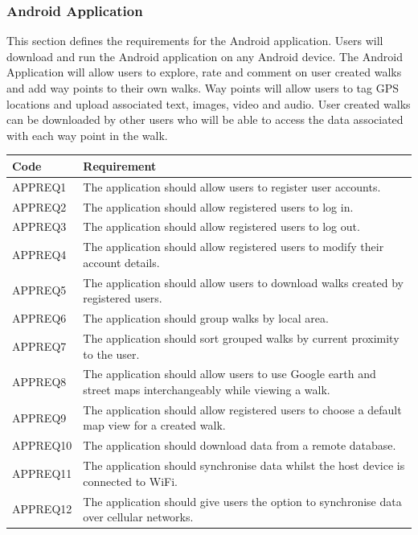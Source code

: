 \documentclass[11pt,a4paper]{article}
\begin{document}
\subsubsection{Android Application}
\label{sec:app-reqs}

This section defines the requirements for the Android application.
Users will download and run the Android application on any Android device.
The Android Application will allow users to explore, rate and comment on user created walks and add way points to their own walks.
Way points will allow users to tag GPS locations and upload associated text, images, video and audio.
User created walks can be downloaded by other users who will be able to access the data associated with each way point in the walk.

\begin{longtable}{|p{2.5cm}p{13cm}|}
\hline
\textbf{Code} & \textbf{Requirement} \\
\hline
APPREQ1 & The application should allow users to register user accounts. \\ \hline
APPREQ2 & The application should allow registered users to log in. \\ \hline
APPREQ3 & The application should allow registered users to log out. \\ \hline
APPREQ4 & The application should allow registered users to modify their account details. \\ \hline
APPREQ5 & The application should allow users to download walks created by registered users. \\ \hline
APPREQ6 & The application should group walks by local area. \\ \hline
APPREQ7 & The application should sort grouped walks by current proximity to the user. \\ \hline
APPREQ8 & The application should allow users to use Google earth and street maps interchangeably while viewing a walk. \\ \hline
APPREQ9 & The application should allow registered users to choose a default map view for a created walk. \\ \hline
APPREQ10 & The application should download data from a remote database. \\ \hline
APPREQ11 & The application should synchronise data whilst the host device is connected to WiFi. \\ \hline
APPREQ12 & The application should give users the option to synchronise data over cellular networks. \\ \hline

\end{longtable}
\end{document}
